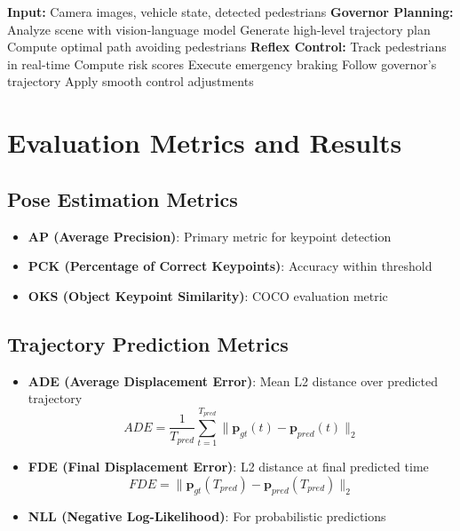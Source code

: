 \documentclass[11pt,a4paper]{article}
\begin{document}
\begin{algorithm}
\caption{Governor-Reflex Control Loop}
\begin{algorithmic}[1]
\State \textbf{Input:} Camera images, vehicle state, detected pedestrians
    \State \textbf{Governor Planning:}
    \State \quad Analyze scene with vision-language model
    \State \quad Generate high-level trajectory plan
    \State \quad Compute optimal path avoiding pedestrians
    \State
    \State \textbf{Reflex Control:}
    \State \quad Track pedestrians in real-time
    \State \quad Compute risk scores
        \State Execute emergency braking
    \Else
        \State Follow governor's trajectory
        \State Apply smooth control adjustments
    \EndIf
\EndWhile
\end{algorithmic}
\end{algorithm}

\section{Evaluation Metrics and Results}

\subsection{Pose Estimation Metrics}

\begin{itemize}
    \item \textbf{AP (Average Precision)}: Primary metric for keypoint detection
    \item \textbf{PCK (Percentage of Correct Keypoints)}: Accuracy within threshold
    \item \textbf{OKS (Object Keypoint Similarity)}: COCO evaluation metric
\end{itemize}

\subsection{Trajectory Prediction Metrics}

\begin{itemize}
    \item \textbf{ADE (Average Displacement Error)}: Mean L2 distance over predicted trajectory
    \begin{equation}
    ADE = \frac{1}{T_{pred}} \sum_{t=1}^{T_{pred}} \|\mathbf{p}_{gt}(t) - \mathbf{p}_{pred}(t)\|_2
    \end{equation}
    
    \item \textbf{FDE (Final Displacement Error)}: L2 distance at final predicted time
    \begin{equation}
    FDE = \|\mathbf{p}_{gt}(T_{pred}) - \mathbf{p}_{pred}(T_{pred})\|_2
    \end{equation}
    
    \item \textbf{NLL (Negative Log-Likelihood)}: For probabilistic predictions
\end{itemize}
\end{document}
